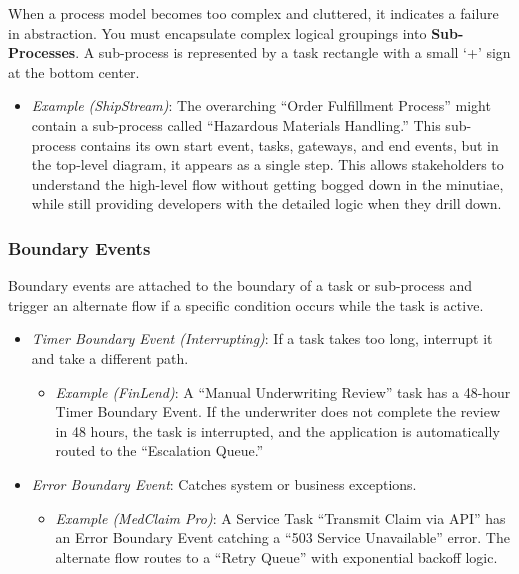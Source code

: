 \documentclass[
  11pt,
  openany,
  oneside]{book}
\providecommand{\tightlist}{%
  \setlength{\itemsep}{0pt}\setlength{\parskip}{0pt}}
\begin{document}
When a process model becomes too complex and cluttered, it indicates a
failure in abstraction. You must encapsulate complex logical groupings
into \textbf{Sub-Processes}. A sub-process is represented by a task
rectangle with a small `+' sign at the bottom center.

\begin{itemize}
\tightlist
\item
  \emph{Example (ShipStream)}: The overarching ``Order Fulfillment
  Process'' might contain a sub-process called ``Hazardous Materials
  Handling.'' This sub-process contains its own start event, tasks,
  gateways, and end events, but in the top-level diagram, it appears as
  a single step. This allows stakeholders to understand the high-level
  flow without getting bogged down in the minutiae, while still
  providing developers with the detailed logic when they drill down.
\end{itemize}

\subsubsection{Boundary Events}\label{boundary-events}

Boundary events are attached to the boundary of a task or sub-process
and trigger an alternate flow if a specific condition occurs while the
task is active.

\begin{itemize}
\tightlist
\item
  \emph{Timer Boundary Event (Interrupting)}: If a task takes too long,
  interrupt it and take a different path.

  \begin{itemize}
  \tightlist
  \item
    \emph{Example (FinLend)}: A ``Manual Underwriting Review'' task has
    a 48-hour Timer Boundary Event. If the underwriter does not complete
    the review in 48 hours, the task is interrupted, and the application
    is automatically routed to the ``Escalation Queue.''
  \end{itemize}
\item
  \emph{Error Boundary Event}: Catches system or business exceptions.

  \begin{itemize}
  \tightlist
  \item
    \emph{Example (MedClaim Pro)}: A Service Task ``Transmit Claim via
    API'' has an Error Boundary Event catching a ``503 Service
    Unavailable'' error. The alternate flow routes to a ``Retry Queue''
    with exponential backoff logic.
  \end{itemize}
\end{itemize}
\end{document}
